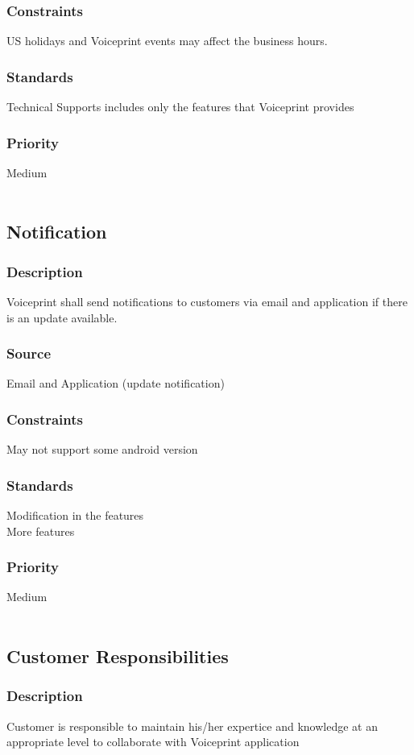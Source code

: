 \subsubsection{Constraints}
US holidays and Voiceprint events may affect the business hours.
\subsubsection{Standards}
Technical Supports includes only the features that Voiceprint provides
\subsubsection{Priority}
Medium
\\
\\
\subsection{Notification}
\subsubsection{Description}
Voiceprint shall send notifications to customers via email and application if there is an update available.
\subsubsection{Source}
Email and Application (update notification)
\subsubsection{Constraints}
May not support some android version
\subsubsection{Standards}
Modification in the features \\
More features 
\subsubsection{Priority}
Medium
\\
\\
\subsection{Customer Responsibilities}
\subsubsection{Description}
Customer is responsible to maintain his/her expertice and knowledge at an appropriate level to collaborate with Voiceprint application
